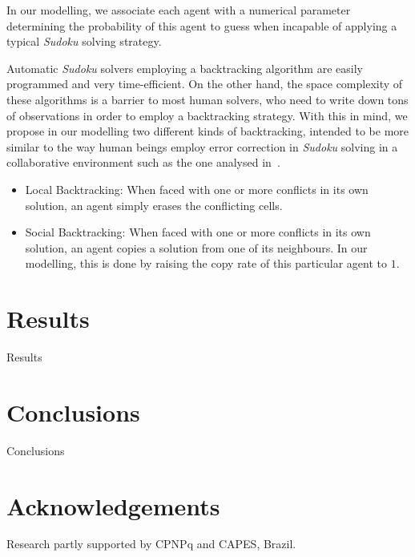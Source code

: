 \documentclass[letterpaper]{article}
\begin{document}
In our modelling, we associate each agent with a numerical parameter determining the probability of this agent to guess when incapable of applying a typical {\em Sudoku} solving strategy.

Automatic {\em Sudoku} solvers employing a backtracking algorithm are easily programmed and very time-efficient. On the other hand, the space complexity of these algorithms is a barrier to most human solvers, who need to write down tons of observations in order to employ a backtracking strategy. With this in mind, we propose in our modelling two different kinds of backtracking, intended to be more similar to the way human beings employ error correction in {\em Sudoku} solving in a collaborative environment such as the one analysed in~\cite{farenzena:collabem}.

\begin{itemize}

\item
Local Backtracking: When faced with one or more conflicts in its own solution, an agent simply erases the conflicting cells.
\item
Social Backtracking: When faced with one or more conflicts in its own solution, an agent copies a solution from one of its neighbours. In our modelling, this is done by raising the copy rate of this particular agent to $1$.

\end{itemize}


\section{Results}

Results

\section{Conclusions}

Conclusions

\section{Acknowledgements}

Research partly supported by CPNPq and CAPES, Brazil.



\end{document}
